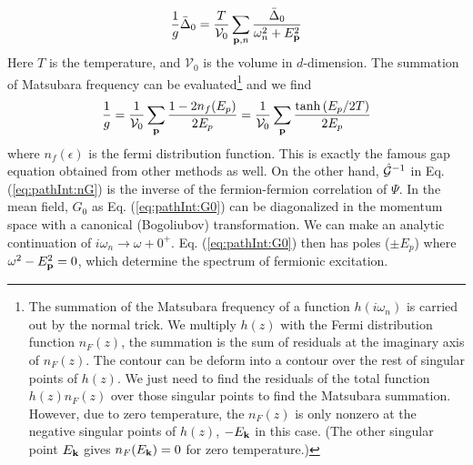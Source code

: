 \begin{equation}
\frac{1}{g}\bar{\Delta}_0=\frac{T}{\mathcal{V}_{0}}\sum_{\mathbf{p},n}\frac{\bar\Delta_0}{\omega_n^2+E_{\mathbf{p}}^2}
\end{equation}
Here $T$ is the temperature, and $\mathcal{V}_{0}$ is the volume in $d$-dimension.  The summation of Matsubara frequency  can be evaluated\footnote{\label{foot:intro:sum}The summation of the Matsubara frequency of a function $h(i\omega_{n})$ is carried out by the normal trick.  We  multiply $h(z)$ with the Fermi distribution function $n_{F}(z)$,  the summation is the sum of residuals at the imaginary axis of $n_{F}(z)$.  The contour can be deform into a contour over the rest of singular points of $h(z)$. We just need to find the residuals of the total function $h(z)n_{F}(z)$ over those singular points to find the Matsubara summation.   However, due to zero temperature, the  $n_{F}(z)$ is only nonzero at the negative singular points of $h(z)$, $-E_{\mathbf{k}}$ in this case.  (The other singular point $E_{\mathbf{k}}$ gives $n_{F}(E_{\mathbf{k}})=0$ for zero temperature.)}  and we find 
\begin{equation}
\frac{1}{g}=\frac{1}{\mathcal{V}_{0}}\sum_{\mathbf{p}}\frac{1-2n_f(E_p)}{2E_p}=\frac{1}{\mathcal{V}_{0}}\sum_{\mathbf{p}}\frac{\tanh{(E_p/2T)}}{2E_p}
\label{eq:pathInt:gap}
\end{equation}
where $n_f(\epsilon)$ is the fermi distribution function.  This is exactly the famous gap equation obtained from other methods as well.  On the other hand, $\hat{\mathcal{G}}^{-1}$ in Eq. (\ref{eq:pathInt:nG})  is the inverse of the  fermion-fermion correlation of $\Psi$.  In the mean field, $G_{0}$ as Eq. (\ref{eq:pathInt:G0}) can be diagonalized in the momentum space with a canonical (Bogoliubov) transformation.  We can make an analytic continuation of $i\omega_{n}\rightarrow\omega+0^{+}$.  Eq. (\ref{eq:pathInt:G0})  then has poles ($\pm{}E_{p}$) where  $\omega^2-E_{\mathbf{p}}^2=0$,  which determine  the spectrum of fermionic excitation.  

